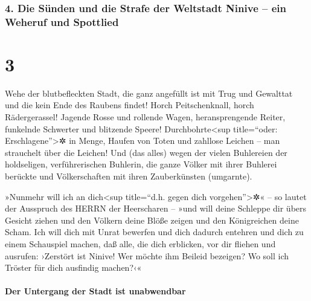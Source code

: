 \hypertarget{die-suxfcnden-und-die-strafe-der-weltstadt-ninive-ein-weheruf-und-spottlied}{%
\subsubsection{4. Die Sünden und die Strafe der Weltstadt Ninive -- ein
Weheruf und
Spottlied}\label{die-suxfcnden-und-die-strafe-der-weltstadt-ninive-ein-weheruf-und-spottlied}}

\hypertarget{section-2}{%
\section{3}\label{section-2}}

 Wehe der blutbefleckten Stadt, die ganz angefüllt ist mit
Trug und Gewalttat und die kein Ende des Raubens findet! 
Horch Peitschenknall, horch Rädergerassel! Jagende Rosse und rollende
Wagen,  heransprengende Reiter, funkelnde Schwerter und
blitzende Speere! Durchbohrte\textless sup title=``oder:
Erschlagene''\textgreater✲ in Menge, Haufen von Toten und zahllose
Leichen -- man strauchelt über die Leichen!  Und (das
alles) wegen der vielen Buhlereien der holdseligen, verführerischen
Buhlerin, die ganze Völker mit ihrer Buhlerei berückte und
Völkerschaften mit ihren Zauberkünsten (umgarnte).

 »Nunmehr will ich an dich\textless sup title=``d.h. gegen
dich vorgehen''\textgreater✲« -- so lautet der Ausspruch des HERRN der
Heerscharen -- »und will deine Schleppe dir übers Gesicht ziehen und den
Völkern deine Blöße zeigen und den Königreichen deine Scham.
 Ich will dich mit Unrat bewerfen und dich dadurch
entehren und dich zu einem Schauspiel machen,  daß alle,
die dich erblicken, vor dir fliehen und ausrufen: ›Zerstört ist Ninive!
Wer möchte ihm Beileid bezeigen? Wo soll ich Tröster für dich ausfindig
machen?‹«

\hypertarget{der-untergang-der-stadt-ist-unabwendbar}{%
\paragraph{Der Untergang der Stadt ist
unabwendbar}\label{der-untergang-der-stadt-ist-unabwendbar}}

